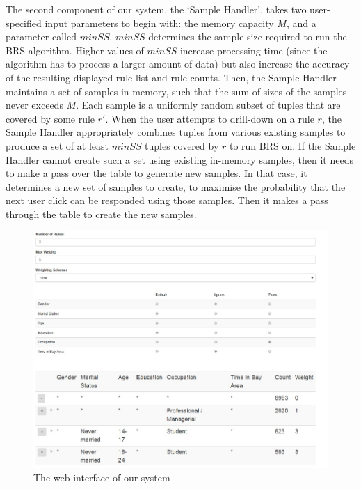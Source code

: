 The second component of our system, the `Sample Handler', takes two user-specified input parameters to begin with: the memory capacity $M$, and a parameter called $minSS$. $minSS$ determines the sample size required to run the BRS algorithm. Higher values of $minSS$ increase processing time (since the algorithm has to process a larger amount of data) but also increase the accuracy of the resulting displayed rule-list and rule counts. Then, the Sample Handler maintains a set of samples in memory, such that the sum of sizes of the samples never exceeds $M$. Each sample is a uniformly random subset of tuples that are covered by some rule $r'$. When the user attempts to drill-down on a rule $r$, the Sample Handler appropriately combines tuples from various existing samples to produce a set of at least $minSS$ tuples covered by $r$ to run BRS on. If the Sample Handler cannot create such a set using existing in-memory samples, then it needs to make a pass over the table to generate new samples. In that case, it determines a new set of samples to create, to maximise the probability that the next user click can be responded using those samples. Then it makes a pass through the table to create the new samples. 

\begin{figure}[ht]
\vspace{-5pt}
\centering
\includegraphics[width=160mm,frame]{graphs/tsapp_screenshot.jpg}
\vspace{-5pt}
\caption{The web interface of our system \label{fig:interface}}
\vspace{-5pt}
\end{figure}

